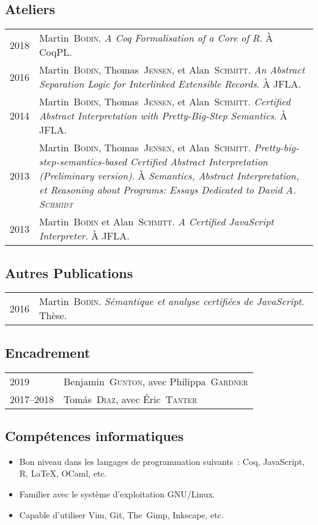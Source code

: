 \documentclass[12pt,a4paper]{article}
\makeatletter
\newenvironment{datecvsection}[1]%
               {\subsection*{#1}%
                 \noindent \begin{tabular}{@{}p{\annee}p{\texte}@{}}}
               {\end{tabular}}
\newenvironment{itemcvsection}[1]%
               {\subsection*{#1}\begin{itemize}}
               {\end{itemize}}
\newcommand\familyName{\textsc}
\makeatother
\begin{document}
\begin{datecvsection}{Ateliers}

  2018 & Martin~\familyName{Bodin}. \textit{A Coq Formalisation of a Core of R}. À CoqPL. \\

  2016 & Martin~\familyName{Bodin}, Thomas~\familyName{Jensen}, et Alan~\familyName{Schmitt}. \textit{An Abstract Separation Logic for Interlinked Extensible Records}. À JFLA. \\

  2014 & Martin~\familyName{Bodin}, Thomas~\familyName{Jensen}, et Alan~\familyName{Schmitt}. \textit{Certified Abstract Interpretation with Pretty-Big-Step Semantics}. À JFLA. \\

  2013 & Martin~\familyName{Bodin}, Thomas~\familyName{Jensen}, et Alan~\familyName{Schmitt}. \textit{Pretty-big-step-semantics-based Certified Abstract Interpretation (Preliminary version)}. À \textit{Semantics, Abstract Interpretation, et Reasoning about Programs: Essays Dedicated to David A. \textsc{Schmidt}} \\ %

  2013 & Martin~\familyName{Bodin} et Alan~\familyName{Schmitt}. \textit{A Certified JavaScript Interpreter}. À JFLA. \\

\end{datecvsection}

\begin{datecvsection}{Autres Publications}

    2016 & Martin~\familyName{Bodin}. \textit{Sémantique et analyse certifiées de JavaScript}. Thèse. \\

\end{datecvsection}

\begin{datecvsection}{Encadrement}

    2019 & Benjamin~\familyName{Gunton}, avec Philippa~\familyName{Gardner} \\
    2017–2018 & Tomás~\familyName{Diaz}, avec Éric~\familyName{Tanter} \\

\end{datecvsection}

\begin{itemcvsection}{Compétences informatiques}

  \item Bon niveau dans les langages de programmation suivants~:  Coq, JavaScript, R, \LaTeX, OCaml, etc.
  \item Familier avec le système d’exploitation GNU/Linux.
  \item Capable d’utiliser Vim, Git, The~Gimp, Inkscape, etc.

\end{itemcvsection}
\end{document}
